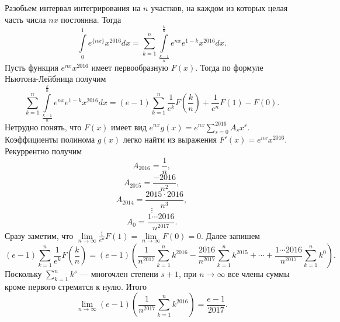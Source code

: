 \documentclass{article}
\begin{document}
Разобьем интервал интегрирования на $n$ участков, на каждом из которых целая часть числа $nx$ постоянна. Тогда
$$\int\limits_0^1 e^{\{nx\}} x^{2016} dx = \sum_{k=1}^n \int\limits_{\frac{k-1}{n}}^{\frac{k}{n}} e^{nx} e^{1-k} x^{2016} dx.$$
Пусть функция $e^{nx} x^{2016}$ имеет первообразную $F(x)$. Тогда по формуле Ньютона-Лейбница получим
$$\sum_{k=1}^n \int\limits_{\frac{k-1}{n}}^{\frac{k}{n}} e^{nx} e^{1-k} x^{2016} dx = (e-1) \sum_{k=1}^n \frac{1}{e^k} F\left( \frac{k}{n} \right) + \frac{1}{e^n} F(1) - F(0).$$
Нетрудно понять, что $F(x)$ имеет вид $e^{nx} g(x) = e^{nx} \sum_{s=0}^{2016} A_s x^s$. Коэффициенты полинома $g(x)$ легко найти из выражения $F'(x) = e^{nx} x^{2016}$. Рекуррентно получим
$$A_{2016} = \frac{1}{n},$$
$$A_{2015} = \frac{-2016}{n^2},$$
$$A_{2014} = \frac{2015 \cdot 2016}{n^3},$$
$$\vdots$$
$$A_{0} = \frac{1 \cdots 2016}{n^{2017}}.$$
Сразу заметим, что $\lim\limits_{n\to \infty} \frac{1}{e^n} F(1) = \lim\limits_{n\to \infty} F(0) = 0$. Далее запишем
$$(e-1) \sum_{k=1}^n \frac{1}{e^k} F\left( \frac{k}{n} \right) = (e-1) \left( \frac{1}{n^{2017}} \sum_{k=1}^n k^{2016} - \frac{2016}{n^{2017}} \sum_{k=1}^n k^{2015} + \cdots + \frac{1 \cdots 2016}{n^{2017}} \sum_{k=1}^n k^0 \right).$$
Поскольку $\sum\limits_{k=1}^n k^s$ --- многочлен степени $s+1$, при $n \to \infty$ все члены суммы кроме первого стремятся к нулю. Итого
$$\lim\limits_{n \to \infty} (e-1) \left( \frac{1}{n^{2017}} \sum_{k=1}^n k^{2016} \right) = \frac{e-1}{2017}.$$
\end{document}
